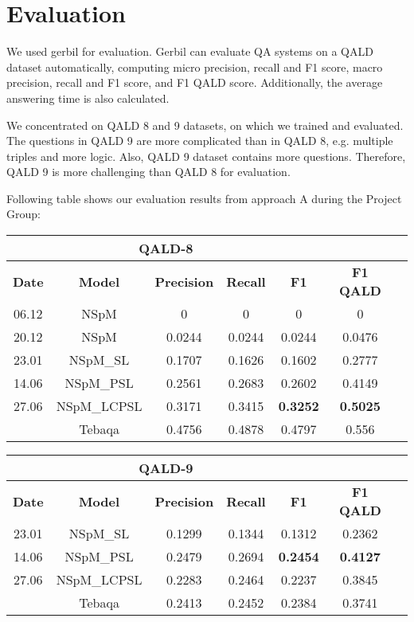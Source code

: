
\section{Evaluation}

We used gerbil for evaluation.
Gerbil can evaluate QA systems on a QALD dataset automatically,
computing micro precision, recall and F1 score, 
macro precision, recall and F1 score,
and F1 QALD score. 
Additionally, the average answering time is also calculated. 

We concentrated on QALD 8 and 9 datasets, on which we trained and evaluated. 
The questions in QALD 9 are more complicated than in QALD 8, 
e.g. multiple triples and more logic.
Also, QALD 9 dataset contains more questions.
Therefore, QALD 9 is more challenging than QALD 8 for evaluation. 

Following table shows our evaluation results from approach A during the Project Group:

\begin{tabular}{ccccccc} \hline
    \multicolumn{5}{c}{QALD-8} \\ \hline
    \textbf{Date} & \textbf{Model}  & \textbf{Precision} & \textbf{Recall} & \textbf{F1} & \textbf{F1 QALD} \\ \hline
    06.12       & NSpM          & 0         & 0         & 0         & 0         \\
    20.12       & NSpM          & 0.0244    & 0.0244    & 0.0244    & 0.0476    \\
    23.01       & NSpM\_SL       & 0.1707    & 0.1626    & 0.1602    & 0.2777    \\
    14.06       & NSpM\_PSL      & 0.2561    & 0.2683    & 0.2602    & 0.4149    \\
    27.06       & NSpM\_LCPSL    & 0.3171    & 0.3415    & \textbf{0.3252}    & \textbf{0.5025}    \\
    \hline
                & Tebaqa        & 0.4756     & 0.4878    & 0.4797   & 0.556   \\
    \hline
\end{tabular}

\begin{tabular}{ccccccc} \hline
    \multicolumn{5}{c}{QALD-9} \\ \hline
    \textbf{Date} & \textbf{Model}  & \textbf{Precision} & \textbf{Recall} & \textbf{F1} & \textbf{F1 QALD} \\ \hline
    23.01       & NSpM\_SL       & 0.1299    & 0.1344    & 0.1312    & 0.2362    \\
    14.06       & NSpM\_PSL      & 0.2479    & 0.2694	 & \textbf{0.2454}    & \textbf{0.4127}    \\
    27.06       & NSpM\_LCPSL    & 0.2283    & 0.2464    & 0.2237    & 0.3845    \\
    \hline
                & Tebaqa        & 0.2413    & 0.2452    & 0.2384    & 0.3741  \\
    \hline
\end{tabular}

